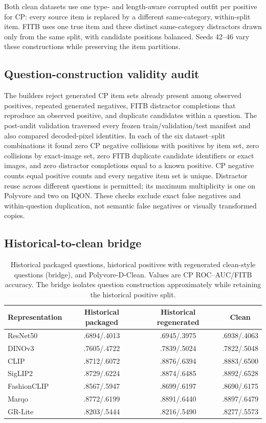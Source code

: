 \documentclass[pdflatex,sn-mathphys-num,iicol]{sn-jnl}
\begin{document}
Both clean datasets use one type- and length-aware corrupted outfit per positive for CP: every source item is replaced by a different same-category, within-split item. FITB uses one true item and three distinct same-category distractors drawn only from the same split, with candidate positions balanced. Seeds 42--46 vary these constructions while preserving the item partitions.

\subsection{Question-construction validity audit}

The builders reject generated CP item sets already present among observed positives, repeated generated negatives, FITB distractor completions that reproduce an observed positive, and duplicate candidates within a question. The post-audit validation traversed every frozen train/validation/test manifest and also compared decoded-pixel identities. In each of the six dataset--split combinations it found zero CP negative collisions with positives by item set, zero collisions by exact-image set, zero FITB duplicate candidate identifiers or exact images, and zero distractor completions equal to a known positive. CP negative counts equal positive counts and every negative item set is unique. Distractor reuse across different questions is permitted; its maximum multiplicity is one on Polyvore and two on IQON. These checks exclude exact false negatives and within-question duplication, not semantic false negatives or visually transformed copies.

\subsection{Historical-to-clean bridge}

\begin{table}[t]
\caption{Historical packaged questions, historical positives with regenerated clean-style questions (bridge), and Polyvore-D-Clean. Values are CP ROC--AUC/FITB accuracy. The bridge isolates question construction approximately while retaining the historical positive split.}
\label{stab:bridge}
\centering\small
\begin{tabular}{lccc}
\toprule
Representation & Historical packaged & Historical regenerated & Clean \\
\midrule
ResNet50 & .6894/.4013 & .6945/.3975 & .6938/.4063 \\
DINOv3 & .7605/.4722 & .7839/.5024 & .7822/.5048 \\
CLIP & .8712/.6072 & .8876/.6394 & .8883/.6500 \\
SigLIP2 & .8729/.6224 & .8874/.6485 & .8892/.6528 \\
FashionCLIP & .8567/.5947 & .8699/.6197 & .8690/.6175 \\
Marqo & .8772/.6199 & .8891/.6440 & .8897/.6479 \\
GR-Lite & .8203/.5444 & .8216/.5490 & .8277/.5573 \\
\bottomrule
\end{tabular}
\end{table}
\end{document}

